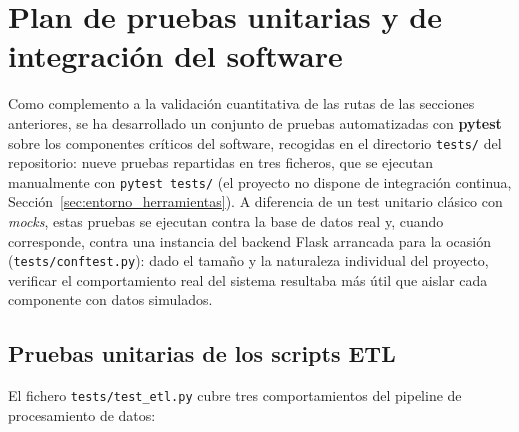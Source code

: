 \section{Plan de pruebas unitarias y de integración del software}
\label{sec:plan_pruebas}

Como complemento a la validación cuantitativa de las rutas de las secciones anteriores, se ha desarrollado un conjunto de pruebas automatizadas con \textbf{pytest} sobre los componentes críticos del software, recogidas en el directorio \texttt{tests/} del repositorio: nueve pruebas repartidas en tres ficheros, que se ejecutan manualmente con \texttt{pytest tests/} (el proyecto no dispone de integración continua, Sección~\ref{sec:entorno_herramientas}). A diferencia de un test unitario clásico con \textit{mocks}, estas pruebas se ejecutan contra la base de datos real y, cuando corresponde, contra una instancia del backend Flask arrancada para la ocasión (\texttt{tests/conftest.py}): dado el tamaño y la naturaleza individual del proyecto, verificar el comportamiento real del sistema resultaba más útil que aislar cada componente con datos simulados.

\subsection{Pruebas unitarias de los scripts ETL}
\label{subsec:pruebas_etl}

El fichero \texttt{tests/test\_etl.py} cubre tres comportamientos del pipeline de procesamiento de datos:


